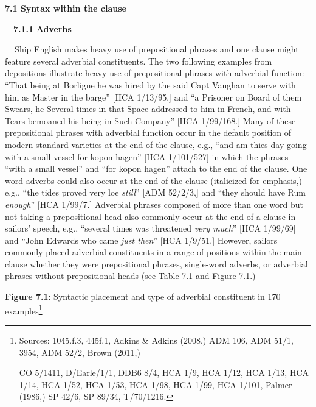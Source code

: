 \begin{styleStandard}
\textbf{7.1 Syntax within the clause}
\end{styleStandard}

\begin{styleStandard}
\ \ \textbf{7.1.1} \textbf{Adverbs}
\end{styleStandard}

\begin{styleStandard}
\textbf{\ \ }Ship English makes heavy use of prepositional phrases and one clause might feature several adverbial constituents. The two following examples from depositions illustrate heavy use of prepositional phrases with adverbial function: “That being at Borligne he was hired by the said Capt Vaughan to serve with him as Master in the barge” [HCA 1/13/95,] and “a Prisoner on Board of them Swears, he Several times in that Space addressed to him in French, and with Tears bemoaned his being in Such Company” [HCA 1/99/168.] Many of these prepositional phrases with adverbial function occur in the default position of modern standard varieties at the end of the clause, e.g., “and am thies day going with a small vessel for kopon hagen” [HCA 1/101/527] in which the phrases “with a small vessel” and “for kopon hagen” attach to the end of the clause. One word adverbs could also occur at the end of the clause (italicized for emphasis,) e.g., “the tides proved very loe \textit{still}” [ADM 52/2/3,] and “they should have Rum \textit{enough}” [HCA 1/99/7.] Adverbial phrases composed of more than one word but not taking a prepositional head also commonly occur at the end of a clause in sailors’ speech, e.g., “several times was threatened \textit{very much}” [HCA 1/99/69] and “John Edwards who came \textit{just then}” [HCA 1/9/51.] However, sailors commonly placed adverbial constituents in a range of positions within the main clause whether they were prepositional phrases, single-word adverbs, or adverbial phrases without prepositional heads (see Table 7.1 and Figure 7.1.) 
\end{styleStandard}

\begin{styleStandard}
  [Warning: Image ignored] %
 
\end{styleStandard}

\begin{styleStandard}
\textbf{Figure 7.1}: Syntactic placement and type of adverbial constituent in 170 examples\footnote{ Sources: 1045.f.3, 445f.1, Adkins \& Adkins (2008,) ADM 106, ADM 51/1, 3954, ADM 52/2, Brown (2011,) \par CO 5/1411, D/Earle/1/1, DDB6 8/4, HCA 1/9, HCA 1/12, HCA 1/13, HCA 1/14, HCA 1/52, HCA 1/53, HCA 1/98, HCA 1/99, HCA 1/101, Palmer (1986,) SP 42/6, SP 89/34, T/70/1216.}
\end{styleStandard}

